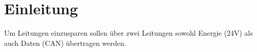 \section{Einleitung}
Um Leitungen einzusparen sollen über zwei Leitungen sowohl Energie (24V) als 
auch Daten (CAN) übertragen werden. 
